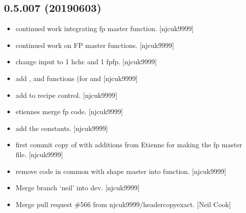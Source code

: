 \documentclass[a4paper,10pt,english]{report}
\begin{document}
\subsection{0.5.007 (2019\sphinxhyphen{}06\sphinxhyphen{}03)}
\label{\detokenize{misc/changelog:id149}}\begin{itemize}
\item {} 
 \sphinxhyphen{} continued work integrating fp master function.
{[}njcuk9999{]}

\item {} 
 \sphinxhyphen{} continued work on FP master functions. {[}njcuk9999{]}

\item {} 
 \sphinxhyphen{} change input to 1 hchc and 1 fpfp. {[}njcuk9999{]}

\item {} 
 \sphinxhyphen{} add ,  and
 functions (for  and 
{[}njcuk9999{]}

\item {} 
 \sphinxhyphen{} add  to recipe control.
{[}njcuk9999{]}

\item {} 
 \sphinxhyphen{} etiennes merge fp code. {[}njcuk9999{]}

\item {} 
 \sphinxhyphen{} add the  constants.
{[}njcuk9999{]}

\item {} 
 \sphinxhyphen{} first commit \sphinxhyphen{} copy of  \sphinxhyphen{}
with additions from Etienne for making the fp master file. {[}njcuk9999{]}

\item {} 
 \sphinxhyphen{} remove code in common with shape master
into function. {[}njcuk9999{]}

\item {} 
Merge branch ‘neil’ into dev. {[}njcuk9999{]}

\item {} 
Merge pull request \#566 from njcuk9999/header\sphinxhyphen{}copy\sphinxhyphen{}exact. {[}Neil Cook{]}


\end{itemize}
\end{document}
